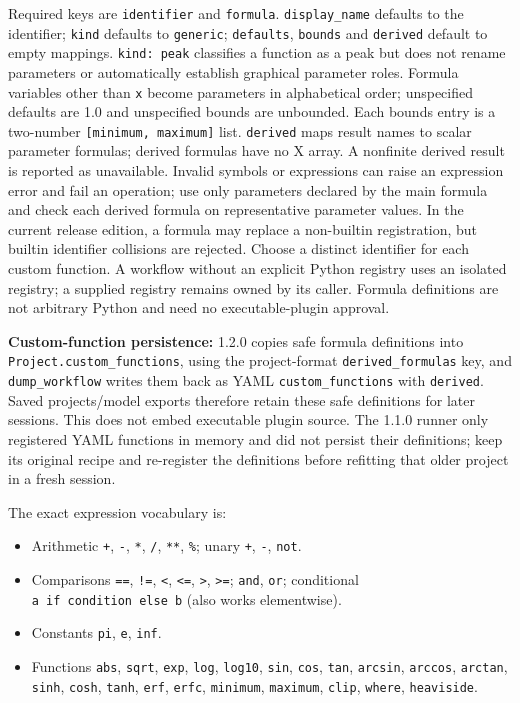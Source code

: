 \documentclass[
  10pt,
  a4paper,
  oneside]{scrreprt}
\providecommand{\tightlist}{%
  \setlength{\itemsep}{0pt}\setlength{\parskip}{0pt}}
\begin{document}
Required keys are \texttt{identifier} and \texttt{formula}.
\texttt{display\_name} defaults to the identifier; \texttt{kind}
defaults to \texttt{generic}; \texttt{defaults}, \texttt{bounds} and
\texttt{derived} default to empty mappings. \texttt{kind:\ peak}
classifies a function as a peak but does not rename parameters or
automatically establish graphical parameter roles. Formula variables
other than \texttt{x} become parameters in alphabetical order;
unspecified defaults are 1.0 and unspecified bounds are unbounded. Each
bounds entry is a two-number \texttt{{[}minimum,\ maximum{]}} list.
\texttt{derived} maps result names to scalar parameter formulas; derived
formulas have no X array. A nonfinite derived result is reported as
unavailable. Invalid symbols or expressions can raise an expression
error and fail an operation; use only parameters declared by the main
formula and check each derived formula on representative parameter
values. In the current release edition, a formula may replace a
non-builtin registration, but builtin identifier collisions are
rejected. Choose a distinct identifier for each custom function. A
workflow without an explicit Python registry uses an isolated registry;
a supplied registry remains owned by its caller. Formula definitions are
not arbitrary Python and need no executable-plugin approval.

\textbf{Custom-function persistence:} 1.2.0 copies safe formula
definitions into \texttt{Project.custom\_functions}, using the
project-format \texttt{derived\_formulas} key, and
\texttt{dump\_workflow} writes them back as YAML
\texttt{custom\_functions} with \texttt{derived}. Saved projects/model
exports therefore retain these safe definitions for later sessions. This
does not embed executable plugin source. The 1.1.0 runner only
registered YAML functions in memory and did not persist their
definitions; keep its original recipe and re-register the definitions
before refitting that older project in a fresh session.

The exact expression vocabulary is:

\begin{itemize}
\tightlist
\item
  Arithmetic \texttt{+}, \texttt{-}, \texttt{*}, \texttt{/},
  \texttt{**}, \texttt{\%}; unary \texttt{+}, \texttt{-}, \texttt{not}.
\item
  Comparisons \texttt{==}, \texttt{!=}, \texttt{\textless{}},
  \texttt{\textless{}=}, \texttt{\textgreater{}},
  \texttt{\textgreater{}=}; \texttt{and}, \texttt{or}; conditional
  \texttt{a\ if\ condition\ else\ b} (also works elementwise).
\item
  Constants \texttt{pi}, \texttt{e}, \texttt{inf}.
\item
  Functions \texttt{abs}, \texttt{sqrt}, \texttt{exp}, \texttt{log},
  \texttt{log10}, \texttt{sin}, \texttt{cos}, \texttt{tan},
  \texttt{arcsin}, \texttt{arccos}, \texttt{arctan}, \texttt{sinh},
  \texttt{cosh}, \texttt{tanh}, \texttt{erf}, \texttt{erfc},
  \texttt{minimum}, \texttt{maximum}, \texttt{clip}, \texttt{where},
  \texttt{heaviside}.
\end{itemize}
\end{document}
